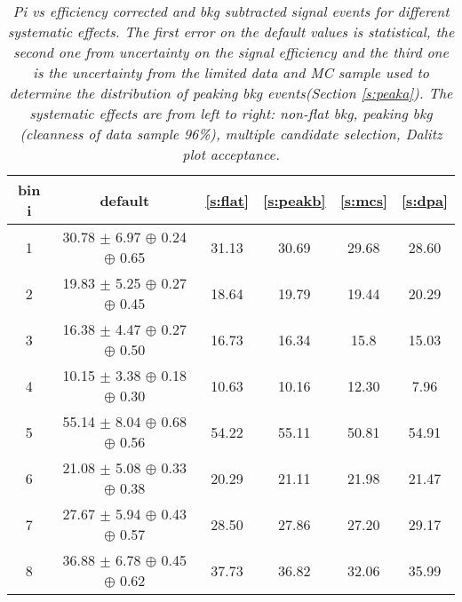 \begin{table}[h!]
\begin{center}
\begin{tabular}{c |c |c |c |c | c}
bin i & default & \ref{s:flat} & \ref{s:peakb} & \ref{s:mcs} & \ref{s:dpa} \\
\hline
1 & 30.78 $\pm$ 6.97 $\oplus$ 0.24 $\oplus$ 0.65 & 31.13 & 30.69 & 29.68 & 28.60 \\ 
\hline
2 & 19.83 $\pm$ 5.25 $\oplus$ 0.27 $\oplus$ 0.45 & 18.64 & 19.79 & 19.44 & 20.29 \\ 
\hline
3 & 16.38 $\pm$ 4.47 $\oplus$ 0.27 $\oplus$ 0.50 & 16.73 & 16.34 & 15.8  & 15.03 \\ 
\hline
4 & 10.15 $\pm$ 3.38 $\oplus$ 0.18 $\oplus$ 0.30 & 10.63 & 10.16 & 12.30 & 7.96 \\ 
\hline
5 & 55.14 $\pm$ 8.04 $\oplus$ 0.68 $\oplus$ 0.56 & 54.22 & 55.11 & 50.81 & 54.91 \\ 
\hline
6 & 21.08 $\pm$ 5.08 $\oplus$ 0.33 $\oplus$ 0.38 & 20.29 & 21.11 & 21.98 & 21.47 \\ 
\hline
7 & 27.67 $\pm$ 5.94 $\oplus$ 0.43 $\oplus$ 0.57 & 28.50 & 27.86 & 27.20 & 29.17 \\ 
\hline
8 & 36.88 $\pm$ 6.78 $\oplus$ 0.45 $\oplus$ 0.62 & 37.73 & 36.82 & 32.06 & 35.99 \\ 
\end{tabular}
\end{center}
\caption{\textit{\4Pi vs \KsPiPi efficiency corrected and bkg subtracted signal events for different systematic effects. The first error on the default values is statistical, the second one from uncertainty on the signal efficiency and the third one is the uncertainty from the limited data and MC sample used to determine the distribution of peaking bkg events(Section \ref{s:peaka}). The systematic effects are from left to right: non-flat bkg, peaking bkg (cleanness of data sample 96\%), multiple candidate selection, Dalitz plot acceptance. }}
\end{table}

